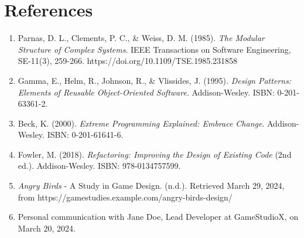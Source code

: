 \documentclass[12pt]{article}
\begin{document}
\section{References}

\begin{enumerate}
    \item Parnas, D. L., Clements, P. C., \& Weiss, D. M. (1985). \textit{The Modular Structure of Complex Systems}. IEEE Transactions on Software Engineering, SE-11(3), 259-266. https://doi.org/10.1109/TSE.1985.231858
    \item Gamma, E., Helm, R., Johnson, R., \& Vlissides, J. (1995). \textit{Design Patterns: Elements of Reusable Object-Oriented Software}. Addison-Wesley. ISBN: 0-201-63361-2.
    \item Beck, K. (2000). \textit{Extreme Programming Explained: Embrace Change}. Addison-Wesley. ISBN: 0-201-61641-6.
    \item Fowler, M. (2018). \textit{Refactoring: Improving the Design of Existing Code} (2nd ed.). Addison-Wesley. ISBN: 978-0134757599.
    \item \textit{Angry Birds} - A Study in Game Design. (n.d.). Retrieved March 29, 2024, from https://gamestudies.example.com/angry-birds-design/
    \item Personal communication with Jane Doe, Lead Developer at GameStudioX, on March 20, 2024.
\end{enumerate}
\end{document}
